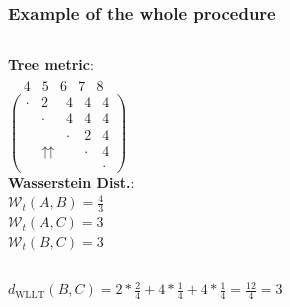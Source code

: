 \addtocounter{framenumber}{-1}
\begin{frame}
\frametitle{Example of the whole procedure}
\begin{columns}[T]%
	\textbf{Tree metric}:\\
	$\begin{array}{ccccc}
	\ \ \; \textit{4} & \textit{5} & \textit{6} & \textit{7} & \textit{8}
	\end{array}$\\
	$
	\left(		
	\begin{array}{ccccc}
	\cdot & 2 & 4 & 4 & 4 \\
	& \cdot & 4 & 4 & 4 \\
	&   & \cdot & 2 & 4 \\
	& \upuparrows & & \cdot & 4\\
	&   &   &   & \cdot
	\end{array}
	\right)
	$\\
	\textbf{Wasserstein Dist.}:\\
	$\mathcal{W}_{t}(A,B) = \frac{4}{3}$\\
	$\mathcal{W}_{t}(A,C) = 3$\\
	$\mathcal{W}_{t}(B,C) = 3$\\
\end{columns}
\vspace{0.5cm}
$d_{\text{WLLT}}(B,C) = 2*\frac{2}{4} + 4*\frac{1}{4} + 4*\frac{1}{4} = \frac{12}{4} = 3$
\end{frame}

